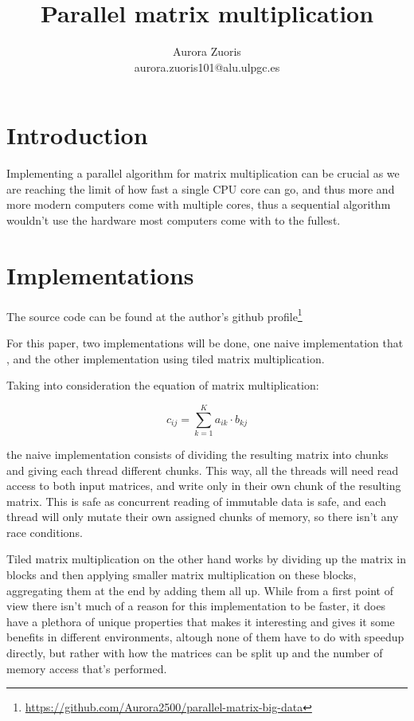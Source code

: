 \documentclass{article}
\author{Aurora Zuoris \\ \normalsize{aurora.zuoris101@alu.ulpgc.es}}
\affil{Universidad de Las Palmas de Gran Canaria}
\title{Parallel matrix multiplication}
\begin{document}
\maketitle


\section{Introduction}

Implementing a parallel algorithm for matrix multiplication can be crucial as we are reaching the limit of how fast
a single CPU core can go, and thus more and more modern computers come with multiple cores, thus a sequential algorithm wouldn't
use the hardware most computers come with to the fullest.

\section{Implementations}

The source code can be found at the author's github profile\footnote{\url{https://github.com/Aurora2500/parallel-matrix-big-data}}

For this paper, two implementations will be done,
one naive implementation that ,
and the other implementation using tiled matrix multiplication.

Taking into consideration the equation of matrix multiplication:

\begin{equation*}
	c_{ij} = \sum_{k=1}^K a_{ik} \cdot b_{kj}
\end{equation*}

the naive implementation consists of dividing the resulting matrix into chunks and giving each thread different chunks.
This way, all the threads will need read access to both input matrices, and write only in their own chunk of the resulting matrix.
This is safe as concurrent reading of immutable data is safe, and each thread will only mutate their own assigned chunks of memory, so there
isn't any race conditions.

Tiled matrix multiplication on the other hand works by dividing up the matrix in blocks and then applying smaller matrix multiplication on these blocks,
aggregating them at the end by adding them all up.
While from a first point of view there isn't much of a reason for this implementation to be faster,
it does have a plethora of unique properties that makes it interesting and gives it some benefits in different environments, altough none of them
have to do with speedup directly, but rather with how the matrices can be split up and the number of memory access that's performed.
\end{document}
